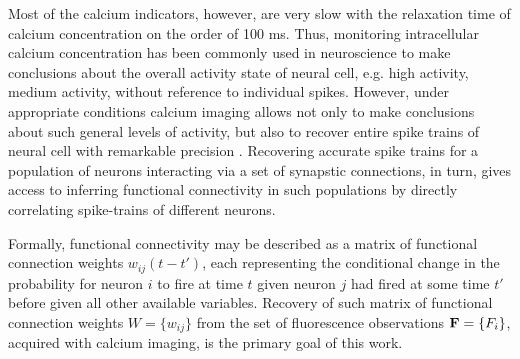 Most of the calcium indicators, however, are very slow with the relaxation time of calcium concentration on the order of 100 ms. Thus, monitoring intracellular calcium concentration has been commonly used in neuroscience to make conclusions about the overall activity state of neural cell, e.g. high activity, medium activity, without reference to individual spikes.  However, under appropriate conditions  calcium imaging allows not only to make conclusions about such general levels of activity, but also to recover entire spike trains of neural cell with remarkable precision \cite{Vogelstein2009}.  Recovering accurate spike trains for a population of neurons interacting via a set of synapstic connections, in turn, gives access to inferring functional connectivity in such populations by directly correlating spike-trains of different neurons.

Formally, functional connectivity may be described as a matrix of functional connection weights $w_{ij}(t-t')$, each representing the conditional change in the probability for neuron $i$ to fire at time $t$ given neuron $j$ had fired at some time $t'$ before given all other available variables.  Recovery of such matrix of functional connection weights $W=\{w_{ij}\}$ from the set of fluorescence observations ${\bf F}=\{F_i\}$, acquired with calcium imaging, is the primary goal of this work.
